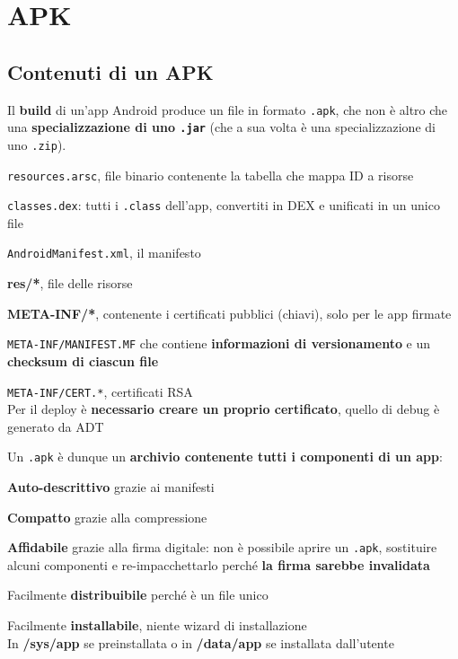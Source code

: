 \documentclass[10pt]{book}
\begin{document}
\section{APK}
\subsection{Contenuti di un APK}
Il \textbf{build} di un'app Android produce un file in formato \texttt{.apk}, che non è altro che una \textbf{specializzazione di uno \texttt{.jar}} (che a sua volta è una specializzazione di uno \texttt{.zip}).
\begin{list}{}{Contenuti:}
	\item \texttt{resources.arsc}, file binario contenente la tabella che mappa ID a risorse
	\item \texttt{classes.dex}: tutti i \texttt{.class} dell'app, convertiti in DEX e unificati in un unico file
	\item \texttt{AndroidManifest.xml}, il manifesto
	\item \textbf{res/*}, file delle risorse
	\item \textbf{META-INF/*}, contenente i certificati pubblici (chiavi), solo per le app firmate
	\begin{list}{}{}
		\item \texttt{META-INF/MANIFEST.MF} che contiene \textbf{informazioni di versionamento} e un \textbf{checksum di ciascun file}
		\item \texttt{META-INF/CERT.*}, certificati RSA\\
		Per il deploy è \textbf{necessario creare un proprio certificato}, quello di debug è generato da ADT
	\end{list}
\end{list}
Un \texttt{.apk} è dunque un \textbf{archivio contenente tutti i componenti di un app}:
\begin{list}{}{}
	\item \textbf{Auto-descrittivo} grazie ai manifesti
	\item \textbf{Compatto} grazie alla compressione
	\item \textbf{Affidabile} grazie alla firma digitale: non è possibile aprire un \texttt{.apk}, sostituire alcuni componenti e re-impacchettarlo perché \textbf{la firma sarebbe invalidata}
	\item Facilmente \textbf{distribuibile} perché è un file unico
	\item Facilmente \textbf{installabile}, niente wizard di installazione\\
	In \textbf{/sys/app} se preinstallata o in \textbf{/data/app} se installata dall'utente
\end{list}
\pagebreak
\end{document}
